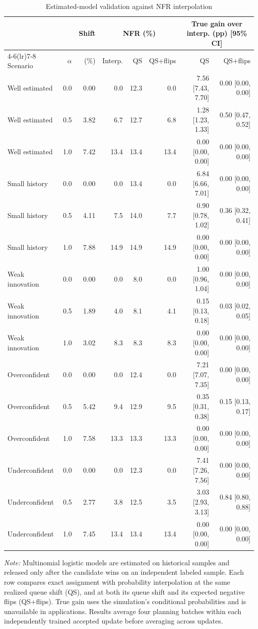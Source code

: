 \begin{table}[H]
\centering
\caption{Estimated-model validation against NFR interpolation}
\label{tab:estimated-validation}
\scriptsize
\begin{tabular}{lrrrrrrr}
\toprule
 & & Shift & \multicolumn{3}{c}{NFR (\%)} & \multicolumn{2}{c}{True gain over interp. (pp) [95\% CI]} \\
\cmidrule(lr){4-6}\cmidrule(lr){7-8}
Scenario & $\alpha$ & (\%) & Interp. & QS & QS+flips & QS & QS+flips \\
\midrule
Well estimated & 0.0 & 0.00 & 0.0 & 12.3 & 0.0 & 7.56 [7.43, 7.70] & 0.00 [0.00, 0.00] \\
Well estimated & 0.5 & 3.82 & 6.7 & 12.7 & 6.8 & 1.28 [1.23, 1.33] & 0.50 [0.47, 0.52] \\
Well estimated & 1.0 & 7.42 & 13.4 & 13.4 & 13.4 & 0.00 [0.00, 0.00] & 0.00 [0.00, 0.00] \\
Small history & 0.0 & 0.00 & 0.0 & 13.4 & 0.0 & 6.84 [6.66, 7.01] & 0.00 [0.00, 0.00] \\
Small history & 0.5 & 4.11 & 7.5 & 14.0 & 7.7 & 0.90 [0.78, 1.02] & 0.36 [0.32, 0.41] \\
Small history & 1.0 & 7.88 & 14.9 & 14.9 & 14.9 & 0.00 [0.00, 0.00] & 0.00 [0.00, 0.00] \\
Weak innovation & 0.0 & 0.00 & 0.0 & 8.0 & 0.0 & 1.00 [0.96, 1.04] & 0.00 [0.00, 0.00] \\
Weak innovation & 0.5 & 1.89 & 4.0 & 8.1 & 4.1 & 0.15 [0.13, 0.18] & 0.03 [0.02, 0.05] \\
Weak innovation & 1.0 & 3.02 & 8.3 & 8.3 & 8.3 & 0.00 [0.00, 0.00] & 0.00 [0.00, 0.00] \\
Overconfident & 0.0 & 0.00 & 0.0 & 12.4 & 0.0 & 7.21 [7.07, 7.35] & 0.00 [0.00, 0.00] \\
Overconfident & 0.5 & 5.42 & 9.4 & 12.9 & 9.5 & 0.35 [0.31, 0.38] & 0.15 [0.13, 0.17] \\
Overconfident & 1.0 & 7.58 & 13.3 & 13.3 & 13.3 & 0.00 [0.00, 0.00] & 0.00 [0.00, 0.00] \\
Underconfident & 0.0 & 0.00 & 0.0 & 12.3 & 0.0 & 7.41 [7.26, 7.56] & 0.00 [0.00, 0.00] \\
Underconfident & 0.5 & 2.77 & 3.8 & 12.5 & 3.5 & 3.03 [2.93, 3.13] & 0.84 [0.80, 0.88] \\
Underconfident & 1.0 & 7.45 & 13.4 & 13.4 & 13.4 & 0.00 [0.00, 0.00] & 0.00 [0.00, 0.00] \\
\bottomrule
\end{tabular}
\begin{minipage}{0.96\linewidth}
\footnotesize\emph{Note:} Multinomial logistic models are estimated on historical samples and released only after the candidate wins on an independent labeled sample. Each row compares exact assignment with probability interpolation at the same realized queue shift (QS), and at both its queue shift and its expected negative flips (QS+flips). True gain uses the simulation's conditional probabilities and is unavailable in applications. Results average four planning batches within each independently trained accepted update before averaging across updates.
\end{minipage}
\end{table}
